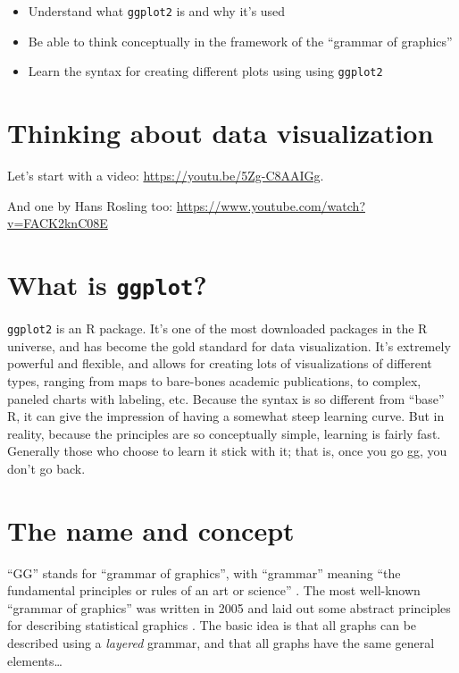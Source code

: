 \documentclass[
]{book}
\providecommand{\tightlist}{%
  \setlength{\itemsep}{0pt}\setlength{\parskip}{0pt}}
\begin{document}
\begin{itemize}
\tightlist
\item
  Understand what \texttt{ggplot2} is and why it's used
\item
  Be able to think conceptually in the framework of the ``grammar of graphics''
\item
  Learn the syntax for creating different plots using using \texttt{ggplot2}
\end{itemize}

\hypertarget{thinking-about-data-visualization}{%
\section{Thinking about data visualization}\label{thinking-about-data-visualization}}

Let's start with a video: \url{https://youtu.be/5Zg-C8AAIGg}.

And one by Hans Rosling too: \url{https://www.youtube.com/watch?v=FACK2knC08E}

\hypertarget{what-is-ggplot}{%
\section*{\texorpdfstring{What is \texttt{ggplot}?}{What is ggplot?}}\label{what-is-ggplot}}

\texttt{ggplot2} is an R package. It's one of the most downloaded packages in the R universe, and has become the gold standard for data visualization. It's extremely powerful and flexible, and allows for creating lots of visualizations of different types, ranging from maps to bare-bones academic publications, to complex, paneled charts with labeling, etc. Because the syntax is so different from ``base'' R, it can give the impression of having a somewhat steep learning curve. But in reality, because the principles are so conceptually simple, learning is fairly fast. Generally those who choose to learn it stick with it; that is, once you go gg, you don't go back.

\hypertarget{the-name-and-concept}{%
\section*{The name and concept}\label{the-name-and-concept}}

``GG'' stands for ``grammar of graphics'', with ``grammar'' meaning ``the fundamental principles or rules of an art or science'' \citep{layered-grammar}. The most well-known ``grammar of graphics'' was written in 2005 and laid out some abstract principles for describing statistical graphics \citep{10.5555/1088896}. The basic idea is that all graphs can be described using a \emph{layered} grammar, and that all graphs have the same general elements\ldots{}
\end{document}
